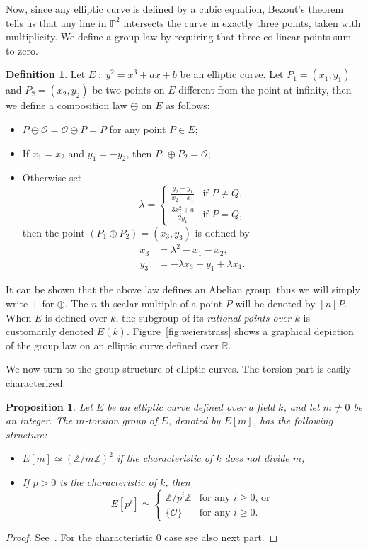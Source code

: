 \documentclass[10pt]{article}
\theoremstyle{plain}
\newtheorem{proposition}[theorem]{Proposition}
\theoremstyle{definition}
\newtheorem{definition}[theorem]{Definition}
\def\P{\ensuremath{\mathbb{P}}}
\def\O{\ensuremath{\mathcal{O}}}
\begin{document}
Now, since any elliptic curve is defined by a cubic equation, Bezout's
theorem tells us that any line in $\P^2$ intersects the curve in
exactly three points, taken with multiplicity. %
We define a group law by requiring that three co-linear points sum to
zero. %

\begin{definition}
  Let $E\;:\;y^2=x^3+ax+b$ be an elliptic curve. Let $P_1=(x_1,y_1)$
  and $P_2=(x_2,y_2)$ be two points on $E$ different from the point at
  infinity, then we define a composition law $⊕$ on $E$ as
  follows:
  \begin{itemize}
  \item $P ⊕ \O = \O ⊕ P = P$ for any point $P∈E$;
  \item If $x_1=x_2$ and $y_1=-y_2$, then $P_1⊕P_2 = \O$;
  \item Otherwise set
    \[λ =
      \begin{cases}
        \frac{y_2-y_1}{x_2-x_1} &\text{if $P≠Q$,}\\
        \frac{3x_1^2+a}{2y_1} &\text{if $P=Q$,}
      \end{cases}
    \]
    then the point $(P_1⊕P_2)=(x_3,y_3)$ is defined by
    \begin{align*}
      x_3 &= λ^2 - x_1 - x_2,\\
      y_3 &= -λx_3 - y_1 + λx_1.
    \end{align*}
  \end{itemize}
\end{definition}

It can be shown that the above law defines an Abelian group, thus we
will simply write $+$ for $⊕$. %
The $n$-th scalar multiple of a point $P$ will be denoted by $[n]P$. %
When $E$ is defined over $k$, the subgroup of its \emph{rational
  points over $k$} is customarily denoted $E(k)$. %
Figure~\ref{fig:weierstrass} shows a graphical depiction of the group
law on an elliptic curve defined over $ℝ$.

We now turn to the group structure of elliptic curves. %
The torsion part is easily characterized.

\begin{proposition}
  Let $E$ be an elliptic curve defined over a field $k$, and let $m≠0$
  be an integer. %
  The $m$-torsion group of $E$, denoted by $E[m]$, has the following
  structure:
  \begin{itemize}
  \item $E[m] ≃ (ℤ/mℤ)^2$ if the characteristic of $k$ does not divide
    $m$;
  \item If $p>0$ is the characteristic of $k$, then 
    \[E[p^i] ≃
      \begin{cases}
        ℤ/p^iℤ & \text{for any $i≥0$, or}\\
        \{\O\} & \text{for any $i≥0$.}
      \end{cases}
    \]
  \end{itemize}
\end{proposition}
\begin{proof}
  See~\cite[Coro.~6.4]{silverman:elliptic}. For the characteristic $0$
  case see also next part.
\end{proof}
\end{document}
